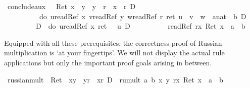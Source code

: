 \begin{isabellebody}
\isamarkupfalse%
\isanewline
\isanewline
\isanewline
\isamarkupfalse%
\ conclude{\isacharunderscore}aux{\isacharcolon}\ {\isachardoublequote}\ {\isasymturnstile}\ {\isacharparenleft}Ret\ {\isacharparenleft}x\ {\isasymnoteq}\ y\ {\isasymand}\ y\ {\isasymnoteq}\ r\ {\isasymand}\ x\ {\isasymnoteq}\ r{\isacharparenright}\ {\isasymand}\isactrlsub D\ \isanewline
\ \ \ \ \ \ \ \ \ {\isasymUp}\ {\isacharparenleft}do\ {\isacharbraceleft}u{\isasymleftarrow}readRef\ x{\isacharsemicolon}\ v{\isasymleftarrow}readRef\ y{\isacharsemicolon}\ w{\isasymleftarrow}readRef\ r{\isacharsemicolon}\ ret\ {\isacharparenleft}u\ {\isacharasterisk}\ v\ {\isacharplus}\ w\ {\isacharequal}\ {\isacharparenleft}a{\isacharcolon}{\isacharcolon}nat{\isacharparenright}\ {\isacharasterisk}\ b{\isacharparenright}{\isacharbraceright}{\isacharparenright}{\isacharparenright}\ {\isasymand}\isactrlsub D\isanewline
\ \ \ \ \ \ \ \ \ {\isasymnot}\isactrlsub D\ {\isasymUp}\ {\isacharparenleft}do\ {\isacharbraceleft}u{\isasymleftarrow}readRef\ x{\isacharsemicolon}\ ret\ {\isacharparenleft}{}\ {\isacharless}\ u{\isacharparenright}{\isacharbraceright}{\isacharparenright}\ {\isasymlongrightarrow}\isactrlsub D\isanewline
\ \ \ \ \ \ \ \ \ {\isacharbrackleft}{\isacharhash}\ readRef\ r{\isacharbrackright}{\isacharparenleft}{\isasymlambda}x{\isachardot}\ Ret\ {\isacharparenleft}x\ {\isacharequal}\ a\ {\isacharasterisk}\ b{\isacharparenright}{\isacharparenright}{\isachardoublequote}\isamarkupfalse%
\isamarkupfalse%
\isamarkupfalse%
\isamarkupfalse%
\isamarkupfalse%
\isamarkupfalse%
\isamarkupfalse%
\isamarkupfalse%
\isamarkupfalse%
\isamarkupfalse%
\isamarkupfalse%
\isamarkupfalse%
\isamarkupfalse%
\isamarkupfalse%
\isamarkupfalse%
\isamarkupfalse%
%
\isamarkuptrue%
%
\begin{isamarkuptext}%
Equipped with all these prerequisites, the correctness proof of Russian multiplication
  is `at your fingertips'\texttrademark. We will not display the actual rule applications but
  only the important proof goals arising in between.
  \label{isa:rumult-proof}%
\end{isamarkuptext}%
\isamarkuptrue%
\ russian{\isacharunderscore}mult{\isacharcolon}\ {\isachardoublequote}{\isasymturnstile}\ {\isacharparenleft}Ret\ {\isacharparenleft}\ x{\isasymnoteq}y\ {\isasymand}\ y{\isasymnoteq}r\ {\isasymand}\ x{\isasymnoteq}r{\isacharparenright}{\isacharparenright}\ {\isasymlongrightarrow}\isactrlsub D\ {\isacharbrackleft}{\isacharhash}\ rumult\ a\ b\ x\ y\ r{\isacharbrackright}{\isacharparenleft}{\isasymlambda}x{\isachardot}\ Ret\ {\isacharparenleft}x\ {\isacharequal}\ a\ {\isacharasterisk}\ b{\isacharparenright}{\isacharparenright}{\isachardoublequote}\isanewline

\end{isabellebody}
